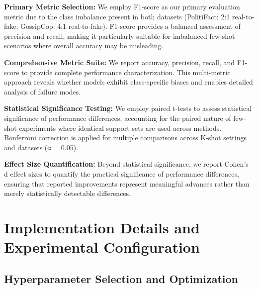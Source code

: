\textbf{Primary Metric Selection:} We employ F1-score as our primary evaluation metric due to the class imbalance present in both datasets (PolitiFact: 2:1 real-to-fake; GossipCop: 4:1 real-to-fake). F1-score provides a balanced assessment of precision and recall, making it particularly suitable for imbalanced few-shot scenarios where overall accuracy may be misleading.

\textbf{Comprehensive Metric Suite:} We report accuracy, precision, recall, and F1-score to provide complete performance characterization. This multi-metric approach reveals whether models exhibit class-specific biases and enables detailed analysis of failure modes.

\textbf{Statistical Significance Testing:} We employ paired t-tests to assess statistical significance of performance differences, accounting for the paired nature of few-shot experiments where identical support sets are used across methods. Bonferroni correction is applied for multiple comparisons across K-shot settings and datasets (α = 0.05).

\textbf{Effect Size Quantification:} Beyond statistical significance, we report Cohen's d effect sizes to quantify the practical significance of performance differences, ensuring that reported improvements represent meaningful advances rather than merely statistically detectable differences.

\section{Implementation Details and Experimental Configuration}

\subsection{Hyperparameter Selection and Optimization}


